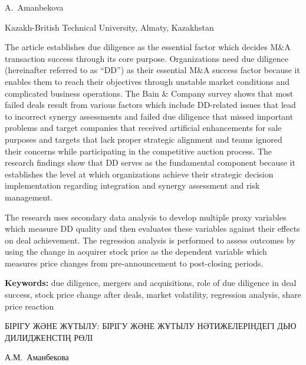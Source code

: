 
\begin{header}

A.~Amanbekova\envelope
\end{header}

\begin{affil}
Kazakh-British Technical University, Almaty, Kazakhstan

\end{affil}

The article establishes due diligence as the essential factor which
decides M\&A transaction success through its core purpose. Organizations
need due diligence (hereinafter referred to as ``DD'') as their
essential M\&A success factor because it enables them to reach their
objectives through unstable market conditions and complicated business
operations. The Bain \& Company survey shows that most failed deals
result from various factors which include DD-related issues that lead to
incorrect synergy assessments and failed due diligence that missed
important problems and target companies that received artificial
enhancements for sale purposes and targets that lack proper strategic
alignment and teams ignored their concerns while participating in the
competitive auction process. The research findings show that DD serves
as the fundamental component because it establishes the level at which
organizations achieve their strategic decision implementation regarding
integration and synergy assessment and risk management.

The research uses secondary data analysis to develop multiple proxy
variables which measure DD quality and then evaluates these variables
against their effects on deal achievement. The regression analysis is
performed to assess outcomes by using the change in acquirer stock price
as the dependent variable which measures price changes from
pre-announcement to post-closing periods.

{\bfseries Keywords:} due diligence, mergers and acquisitions, role of due
diligence in deal success, stock price change after deals, market
volatility, regression analysis, share price reaction

\begin{header}
БІРІГУ ЖӘНЕ ЖҰТЫЛУ: БІРІГУ ЖӘНЕ ЖҰТЫЛУ НӘТИЖЕЛЕРІНДЕГІ ДЬЮ ДИЛИДЖЕНСТІҢ РӨЛІ

А.М.~Аманбекова\envelope
\end{header}

